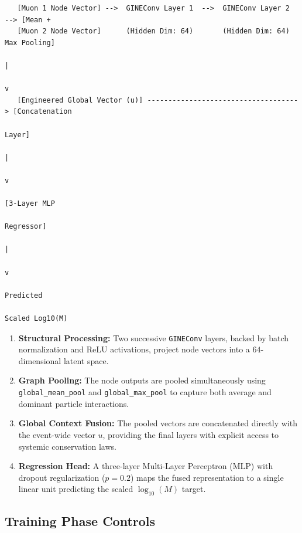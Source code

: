 \documentclass[11pt,a4paper]{article}
\begin{document}
\begin{verbatim}
   [Muon 1 Node Vector] -->  GINEConv Layer 1  -->  GINEConv Layer 2  --> [Mean +
   [Muon 2 Node Vector]      (Hidden Dim: 64)       (Hidden Dim: 64)     Max Pooling]
                                                                               |
                                                                               v
   [Engineered Global Vector (u)] ------------------------------------> [Concatenation 
                                                                             Layer]
                                                                               |
                                                                               v
                                                                         [3-Layer MLP
                                                                          Regressor]
                                                                               |
                                                                               v
                                                                          Predicted 
                                                                        Scaled Log10(M)
\end{verbatim}

\begin{enumerate}
    \item \textbf{Structural Processing:} Two successive \texttt{GINEConv} layers, backed by batch normalization and ReLU activations, project node vectors into a $64$-dimensional latent space.
    \item \textbf{Graph Pooling:} The node outputs are pooled simultaneously using \texttt{global\_mean\_pool} and \texttt{global\_max\_pool} to capture both average and dominant particle interactions.
    \item \textbf{Global Context Fusion:} The pooled vectors are concatenated directly with the event-wide vector $u$, providing the final layers with explicit access to systemic conservation laws.
    \item \textbf{Regression Head:} A three-layer Multi-Layer Perceptron (MLP) with dropout regularization ($p=0.2$) maps the fused representation to a single linear unit predicting the scaled $\log_{10}(M)$ target.
\end{enumerate}

\subsection{Training Phase Controls}
\end{document}
